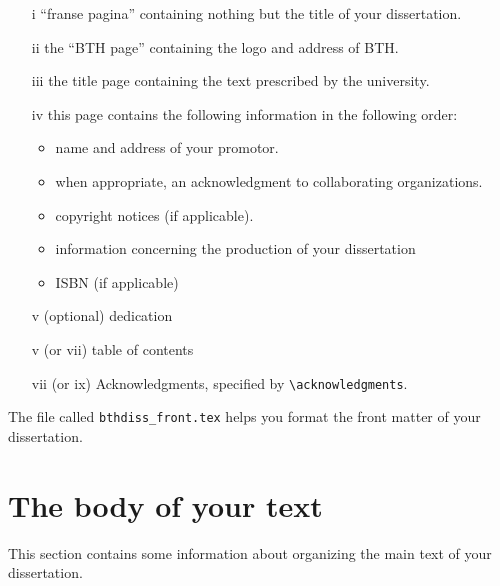 \begin{enumerate}
  \item[i] ``franse pagina'' containing nothing but the title of your dissertation.
  \item[ii] the ``BTH page'' containing the logo and address of BTH.
  \item[iii] the title page containing the text prescribed by the university.
  \item[iv] this page contains the following information in the following order:
    \begin{itemize}
      \item name and address of your promotor.
      \item when appropriate, an acknowledgment to collaborating organizations.
      \item copyright notices (if applicable).
      \item information concerning the production of your dissertation
      \item ISBN (if applicable)
	\end{itemize}
  \item[v] (optional) dedication
  \item[v] (or vii) table of contents
  \item[vii] (or ix) Acknowledgments, specified by \verb|\acknowledgments|.
\end{enumerate}

The file called  \verb|bthdiss_front.tex| helps you format the front matter of your dissertation.

\section{The body of your text}
This section contains some information about organizing the main
text of your dissertation.

